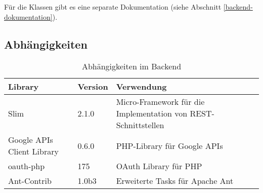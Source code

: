 Für die Klassen gibt es eine separate Dokumentation (siehe Abschnitt \ref{backend-dokumentation}).

\subsection{Abhängigkeiten}
\label{backend-abhaengigkeiten}

\begin{table}[H]
\centering
\begin{tabular}{|p{0.35\threecelltabwidth}|p{0.15\threecelltabwidth}|p{0.50\threecelltabwidth}|}
\hline 
\textbf{Library} & \textbf{Version} & \textbf{Verwendung} \\
\hline 
Slim & 2.1.0 & Micro-Framework für die Implementation von \gls{REST}-Schnittstellen \\
\hline 
Google APIs Client Library & 0.6.0 & PHP-Library für Google \glspl{API} \\
\hline 
oauth-php & 175 & \gls{OAuth} Library für PHP \\
\hline 
Ant-Contrib & 1.0b3 & Erweiterte Tasks für Apache Ant \\
\hline 
\end{tabular}
\caption{Abhängigkeiten im Backend}
\label{table-backend-dependencies}
\end{table}


